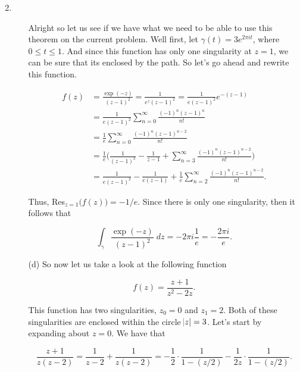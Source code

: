 \documentclass{article}
\makeatletter
\theoremstyle{definition}
\theoremstyle{remark}
\newenvironment{solution}[1][\bf{\textit{Solution}}]{\par
  
  \normalfont \topsep6\p@\@plus6\p@\relax
  \list{}{\leftmargin=0mm
          \rightmargin=0mm
          \settowidth{\itemindent}{\itshape#1}%
          \labelwidth=\itemindent
          \parsep=0pt \listparindent=\parindent 
  }
  \item[\hskip\labelsep
        \itshape
    #1\@addpunct{.}]\ignorespaces
}{%
  \popQED\endlist\@endpefalse
}
\makeatother
\begin{document}
\begin{enumerate}[leftmargin=*]
\begin{solution}
\begin{enumerate}[label=(\alph*)]
             Alright so let us see if we have what we need to be able to use this theorem on the current problem. Well first, let $\gamma(t)=3e^{2\pi it}$, where $0\leq t\leq 1$. And since this function has only one singularity at $z=1$, we can be sure that its enclosed by the path.  So let's go ahead and rewrite this function.
             
             \begin{equation*}
                 \begin{split}
                     f(z) &= \frac{\exp{(-z)}}{(z-1)^2}=\frac{1}{e^z(z-1)^2}=\frac{1}{e(z-1)^2}e^{-(z-1)} \\
                     &= \frac{1}{e(z-1)^2}\sum_{n=0}^{\infty}\frac{(-1)^n(z-1)^n}{n!} \\
                     &= \frac{1}{e}\sum_{n=0}^{\infty}\frac{(-1)^n(z-1)^{n-2}}{n!} \\
                     &= \frac{1}{e}\bigg(\frac{1}{(z-1)^2}-\frac{1}{z-1}+\sum_{n=3}^{\infty}\frac{(-1)^n(z-1)^{n-2}}{n!}\bigg) \\ 
                     &= \frac{1}{e(z-1)^2}-\frac{1}{e(z-1)}+\frac{1}{e}\sum_{n=2}^{\infty}\frac{(-1)^n(z-1)^{n-2}}{n!}.
                 \end{split}
             \end{equation*}
             
             \noindent Thus, Res$_{z=1}\big(f(z)\big)=-1/e$. Since there is only one singularity, then it follows that 
             
             \begin{equation*}
                 \int_{\gamma}\frac{\exp{(-z)}}{(z-1)^2}\;dz=-2\pi i\frac{1}{e}=-\frac{2\pi i}{e}.
             \end{equation*}
             
             \item[(d)] So now let us take a look at the following function 
             
             \begin{equation*}
                 f(z)=\frac{z+1}{z^2-2z}.
             \end{equation*}
             
             \noindent This function has two singularities, $z_0=0$ and $z_1=2$. Both of these singularities are enclosed within the circle $\abs{z}=3$. Let's start by expanding about $z=0$. We have that 
             
             \begin{equation*}
                 \frac{z+1}{z(z-2)}=\frac{1}{z-2}+\frac{1}{z(z-2)}=-\frac{1}{2}\cdot\frac{1}{1-(z/2)}-\frac{1}{2z}\cdot\frac{1}{1-(z/2)}.
             \end{equation*}
             

\end{enumerate}
\end{solution}
\end{enumerate}
\end{document}

